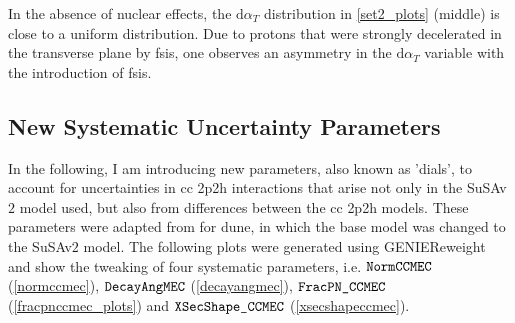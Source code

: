 \fi%
In the absence of nuclear effects, the $\mathrm{d}\alpha_T$ distribution in \cref{set2_plots} (middle) is close to a uniform distribution. Due to protons that were strongly decelerated in the transverse plane by \acrshort{fsi}s, one observes an asymmetry in the $\mathrm{d}\alpha_T$ variable with the introduction of \acrshort{fsi}s. %
\vspace{-3mm}
\subsection{New Systematic Uncertainty Parameters} \vspace{-2mm}\label{set3}
In the following, I am introducing new parameters, also known as 'dials', to account for uncertainties in \acrshort{cc} \acrshort{2p2h} interactions that arise not only in the SuSAv$2$ model used, but also from differences between the \acrshort{cc} \acrshort{2p2h} models. These parameters were adapted from \cite{PhysRevD.105.072001} for \acrshort{dune}, in which the base model was changed to the SuSAv$2$ model. The following plots were generated using GENIEReweight and show the tweaking of four systematic parameters, i.e. $\verb!NormCCMEC!$ (\cref{normccmec}), $\verb!DecayAngMEC!$ (\cref{decayangmec}), $\verb!FracPN_CCMEC!$ (\cref{fracpnccmec_plots}) and $\verb!XSecShape_CCMEC!$ (\cref{xsecshapeccmec}).
\vspace{-8mm}
